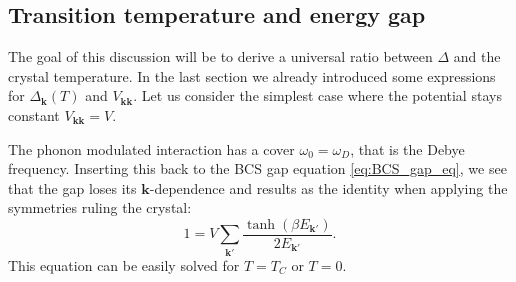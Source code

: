 \documentclass[../main.tex]{subfile}
\begin{document}
\subsection{Transition temperature and energy gap}
The goal of this discussion will be to derive a universal ratio between $\Delta$ and the crystal temperature. In the last section 
we already introduced some expressions for $\Delta_{\bm{k}}(T)$ and $V_{\bm{k}\bm{k}}$. Let us consider the simplest case where the potential stays constant $V_{\bm{k}\bm{k}} = V$.

The phonon modulated interaction has a cover $\omega_0 = \omega_D$, that is the Debye frequency. Inserting this back to the BCS gap equation 
\ref{eq:BCS_gap_eq}, we see that the gap loses its $\bm{k}$-dependence and results as the identity when applying the symmetries
ruling the crystal:
\begin{equation*}
    1 = V\sum_{\bm{k}'} \frac{\tanh\left(\beta E_{\bm{k}'}\right)}{2 E_{\bm{k}'}}.
\end{equation*}
This equation can be easily solved for $T=T_C$ or $T = 0$.\\
\end{document}
